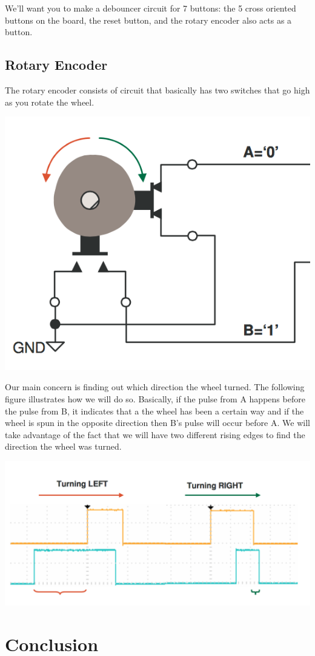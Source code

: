 \documentclass[11pt]{article}
\begin{document}
We'll want you to make a debouncer circuit for 7 buttons: the 5 cross oriented buttons on the board, the reset button, and the rotary encoder also acts as a button.

\subsection{Rotary Encoder}

The rotary encoder consists of circuit that basically has two switches that go high as you rotate the wheel. 

\includegraphics[width=\textwidth]{images/lab2_fig5.png}

Our main concern is finding out which direction the wheel turned. The following figure illustrates how we will do so. Basically, if the pulse from A happens before the pulse from B, it indicates that a the wheel has been a certain way and if the wheel is spun in the opposite direction then B's pulse will occur before A. We will take advantage of the fact that we will have two different rising edges to find the direction the wheel was turned.

\includegraphics[width=\textwidth]{images/lab2_fig6.png}


\section{Conclusion}
\end{document}

